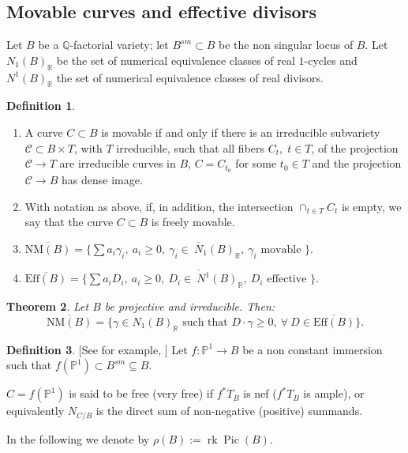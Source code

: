 \documentclass[11pt]{amsart}
\newtheorem{theorem}{Theorem}[section]
\theoremstyle{definition}
\newtheorem{definition}[theorem]{Definition}
\theoremstyle{definition}
\theoremstyle{remark}
\theoremstyle{remark}
\theoremstyle{definition}
\theoremstyle{conjecture}
\def\PP{{\mathbb P}}
\begin{document}
\subsection{Movable curves and effective divisors}
Let $B$ be a $\mathbb Q$-factorial variety; let $B^{sm} \subset B$ be the non singular locus of $B$.
Let $N_1(B)_{\mathbb{R}}$ be the set of  numerical equivalence  classes of  real $1$-cycles and 
  $N^1(B)_{\mathbb{R}}$ the set of  numerical equivalence  classes of  real  divisors.
\begin{definition}\label{movable}
\begin{enumerate}
\item  A curve $C\subset B$ is movable if and only if there is an irreducible subvariety ${\mathcal C}\subset B\times T$, with $T$ irreducible, such that all fibers $C_t,\;t\in T$, of the projection ${\mathcal C}\to T$
are irreducible curves in $B$, $C=C_{t_0}$ for some $t_0\in T$ and  the projection ${\mathcal C}\to B$ has dense image.
\item With notation as above, if, in addition, the intersection
    $\cap_{t\in T}C_t$ is empty, we say that the curve $C\subset B$ is
        freely movable.
   \item $\overline{\mathrm{NM}(B)}=\overline{\{ \sum a_i \gamma_i, \ a_i \geq 0, \ \gamma_i \in \ N_1(B)_{\mathbb{R}}, \ \gamma_i \text{ movable }\}}.$
	\item $\overline{\mathrm{Eff}(B)}=\overline{\{ \sum a_i D_i, \ a_i \geq 0, \ D_i \in \ N^1(B)_{\mathbb{R}}, \ D_i \text{ effective }\}}.$
\end{enumerate}

\end{definition}
\begin{theorem}\label{thm:BDPaP}%
\cite{BDPP}
 Let $B$ be projective  and irreducible. Then: $$\overline{\mathrm{NM}(B)}= \{ \gamma \in N_1(B)_{\mathbb{R}} \text{ such that } D \cdot \gamma \geq 0, \ \forall  \ D \in \overline{\mathrm{Eff}(B)} \}.$$

\end{theorem}

 \begin{definition}\label{def:freeVerFree}[See for example, \cite[Section 2.4]{Debarre2011GAEL}] Let $f: \PP^1\to B$ be a non constant immersion such that $f(\PP^1) \subset B^{sm} \subseteq B$. 
 
 $C=f(\mathbb{P}^1)$  is said to be free (very free) if \( f^*T_B\) is nef (\( f^*T_B \) is ample), or equivalently
$N_{C/B}$ is the direct sum of non-negative (positive) summands.
 
 \end{definition}
In the following we denote by
 $\rho(B):=\operatorname{rk} \operatorname{Pic} (B)$.
\end{document}
